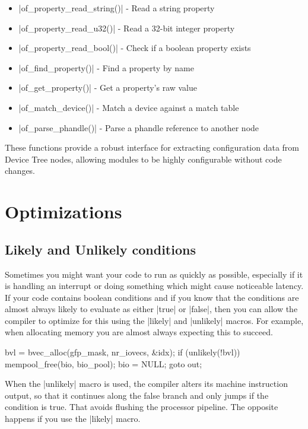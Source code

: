 \documentclass[10pt, oneside]{book}
\begin{document}
\begin{itemize}
\item \cpp|of_property_read_string()| - Read a string property
\item \cpp|of_property_read_u32()| - Read a 32-bit integer property
\item \cpp|of_property_read_bool()| - Check if a boolean property exists
\item \cpp|of_find_property()| - Find a property by name
\item \cpp|of_get_property()| - Get a property's raw value
\item \cpp|of_match_device()| - Match a device against a match table
\item \cpp|of_parse_phandle()| - Parse a phandle reference to another node
\end{itemize}

These functions provide a robust interface for extracting configuration data from Device Tree nodes,
allowing modules to be highly configurable without code changes.

\section{Optimizations}
\label{sec:optimization}
\subsection{Likely and Unlikely conditions}
\label{sec:likely_unlikely}
Sometimes you might want your code to run as quickly as possible, especially if it is handling an interrupt or doing something which might cause noticeable latency.
If your code contains boolean conditions and if you know that the conditions are almost always likely to evaluate as either \cpp|true| or \cpp|false|,
then you can allow the compiler to optimize for this using the \cpp|likely| and \cpp|unlikely| macros.
For example, when allocating memory you are almost always expecting this to succeed.

\begin{code}
bvl = bvec_alloc(gfp_mask, nr_iovecs, &idx);
if (unlikely(!bvl)) {
    mempool_free(bio, bio_pool);
    bio = NULL;
    goto out;
}
\end{code}

When the \cpp|unlikely| macro is used, the compiler alters its machine instruction output, so that it continues along the false branch and only jumps if the condition is true.
That avoids flushing the processor pipeline.
The opposite happens if you use the \cpp|likely| macro.
\end{document}
